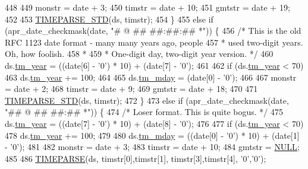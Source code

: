 \begin{DoxyCode}
448 
449         monstr = date + 3;
450         timstr = date + 10;
451         gmtstr = date + 19;
452 
453         \hyperlink{apr__date_8c_a574f7cc7ba24c017bff5d6c41cf5903d}{TIMEPARSE\_STD}(ds, timstr);
454     \} 
455     \textcolor{keywordflow}{else} \textcolor{keywordflow}{if} (apr\_date\_checkmask(date, \textcolor{stringliteral}{"# @$$ ## ##:##:## *"})) \{
456         \textcolor{comment}{/* This is the old RFC 1123 date format - many many years ago, people}
457 \textcolor{comment}{         * used two-digit years.  Oh, how foolish.}
458 \textcolor{comment}{         *}
459 \textcolor{comment}{         * One-digit day, two-digit year version. */}
460         ds.\hyperlink{structapr__time__exp__t_a35c32245be49279a6689e34bcd6e534a}{tm\_year} = ((date[6] - \textcolor{charliteral}{'0'}) * 10) + (date[7] - \textcolor{charliteral}{'0'});
461 
462         \textcolor{keywordflow}{if} (ds.\hyperlink{structapr__time__exp__t_a35c32245be49279a6689e34bcd6e534a}{tm\_year} < 70)
463             ds.\hyperlink{structapr__time__exp__t_a35c32245be49279a6689e34bcd6e534a}{tm\_year} += 100;
464 
465         ds.\hyperlink{structapr__time__exp__t_a6c09a274f011841e9e988c3c9504848a}{tm\_mday} = (date[0] - \textcolor{charliteral}{'0'});
466 
467         monstr = date + 2;
468         timstr = date + 9;
469         gmtstr = date + 18;
470 
471         \hyperlink{apr__date_8c_a574f7cc7ba24c017bff5d6c41cf5903d}{TIMEPARSE\_STD}(ds, timstr);
472     \} 
473     \textcolor{keywordflow}{else} \textcolor{keywordflow}{if} (apr\_date\_checkmask(date, \textcolor{stringliteral}{"## @$$ ## ##:## *"})) \{
474         \textcolor{comment}{/* Loser format.  This is quite bogus.  */}
475         ds.\hyperlink{structapr__time__exp__t_a35c32245be49279a6689e34bcd6e534a}{tm\_year} = ((date[7] - \textcolor{charliteral}{'0'}) * 10) + (date[8] - \textcolor{charliteral}{'0'});
476 
477         \textcolor{keywordflow}{if} (ds.\hyperlink{structapr__time__exp__t_a35c32245be49279a6689e34bcd6e534a}{tm\_year} < 70)
478             ds.\hyperlink{structapr__time__exp__t_a35c32245be49279a6689e34bcd6e534a}{tm\_year} += 100;
479 
480         ds.\hyperlink{structapr__time__exp__t_a6c09a274f011841e9e988c3c9504848a}{tm\_mday} = ((date[0] - \textcolor{charliteral}{'0'}) * 10) + (date[1] - \textcolor{charliteral}{'0'});
481 
482         monstr = date + 3;
483         timstr = date + 10;
484         gmtstr = \hyperlink{pcre_8txt_ad7f989d16aa8ca809a36bc392c07fba1}{NULL};
485 
486         \hyperlink{apr__date_8c_aa1f7825c136058e465186eb635d12f11}{TIMEPARSE}(ds, timstr[0],timstr[1], timstr[3],timstr[4], \textcolor{charliteral}{'0'},\textcolor{charliteral}{'0'});

\end{DoxyCode}
